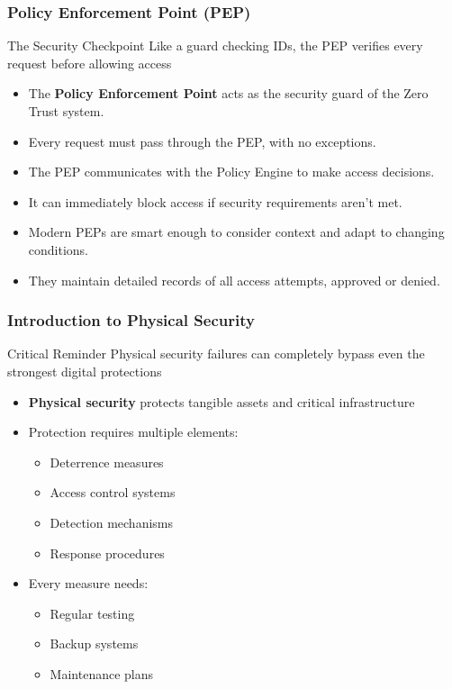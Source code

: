 \documentclass{beamer}
\begin{document}
\begin{frame}
    \frametitle{Policy Enforcement Point (PEP)}
    \begin{block}{The Security Checkpoint}
        Like a guard checking IDs, the PEP verifies every request before allowing access
    \end{block}
    \begin{itemize}
        \item The \textbf{Policy Enforcement Point} acts as the security guard of the Zero Trust system.
        \item Every request must pass through the PEP, with no exceptions.
        \item The PEP communicates with the Policy Engine to make access decisions.
        \item It can immediately block access if security requirements aren't met.
        \item Modern PEPs are smart enough to consider context and adapt to changing conditions.
        \item They maintain detailed records of all access attempts, approved or denied.
    \end{itemize}
\end{frame}
\begin{frame}
    \frametitle{Introduction to Physical Security}
    \begin{alertblock}{Critical Reminder}
        Physical security failures can completely bypass even the strongest digital protections
    \end{alertblock}
    \begin{itemize}
        \item \textbf{Physical security} protects tangible assets and critical infrastructure
        \item Protection requires multiple elements:
          \begin{itemize}
            \item Deterrence measures
            \item Access control systems
            \item Detection mechanisms
            \item Response procedures
          \end{itemize}
        \item Every measure needs:
          \begin{itemize}
            \item Regular testing
            \item Backup systems
            \item Maintenance plans
          \end{itemize}
    \end{itemize}
\end{frame}
\end{document}
